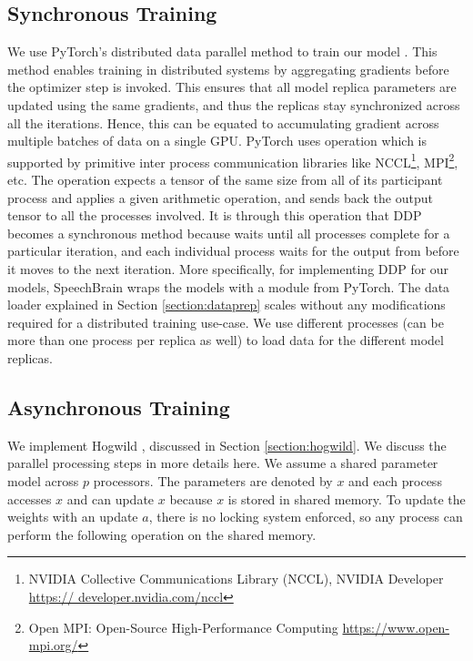 \subsection{Synchronous Training}
We use PyTorch's distributed data parallel method to train our model \cite{Li2020PyTorchTraining}. This method enables training in distributed systems by aggregating gradients before the optimizer step is invoked. This ensures that all model replica parameters are updated using the same gradients, and thus the replicas stay synchronized across all the iterations. Hence, this can be equated to accumulating gradient across multiple batches of data on a single GPU. PyTorch uses  operation which is supported by primitive inter process communication libraries like NCCL\footnote{NVIDIA Collective Communications Library (NCCL), NVIDIA Developer \href{https://developer.nvidia.com/nccl}{https:// developer.nvidia.com/nccl}}, MPI\footnote{Open MPI: Open-Source High-Performance Computing \href{https://www.open-mpi.org/}{https://www.open-mpi.org/}}, etc. The  operation expects a tensor of the same size from all of its participant process and applies a given arithmetic operation, and sends back the output tensor to all the processes involved. It is through this operation that DDP becomes a synchronous method because   waits until all processes complete for a particular iteration, and each individual process waits for the output from  before it moves to the next iteration. More specifically, for implementing DDP for our models, SpeechBrain wraps the models with a  module from PyTorch. The data loader explained in Section \ref{section:dataprep} scales without any modifications required for a distributed training use-case. We use different processes (can be more than one process per replica as well) to load data for the different model replicas.

\subsection{Asynchronous Training}
We implement Hogwild \cite{Niu2011HOGWILD:Descent}, discussed in Section \ref{section:hogwild}. We discuss the parallel processing steps in more details here. We assume a shared parameter model across $p$ processors. The parameters are denoted by $x$ and each process accesses $x$ and can update $x$ because $x$ is stored in shared memory. To update the weights with an update $a$, there is no locking system enforced, so any process can perform the following operation on the shared memory.

